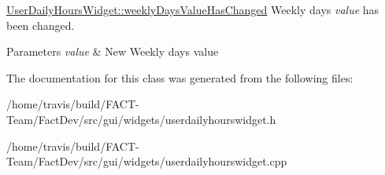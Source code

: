 \hyperlink{classGui_1_1Widgets_1_1UserDailyHoursWidget_a1419c5a32c0b786215b3b2b6b348be05}{User\-Daily\-Hours\-Widget\-::weekly\-Days\-Value\-Has\-Changed} Weekly days {\itshape value} has been changed. 


\begin{DoxyParams}{Parameters}
{\em value} & New Weekly days value \\
\hline
\end{DoxyParams}


The documentation for this class was generated from the following files\-:\begin{DoxyCompactItemize}
\item 
/home/travis/build/\-F\-A\-C\-T-\/\-Team/\-Fact\-Dev/src/gui/widgets/userdailyhourswidget.\-h\item 
/home/travis/build/\-F\-A\-C\-T-\/\-Team/\-Fact\-Dev/src/gui/widgets/userdailyhourswidget.\-cpp\end{DoxyCompactItemize}

